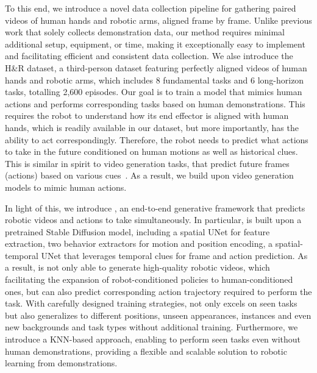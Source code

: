 To this end, we introduce a novel data collection pipeline for gathering paired videos of human hands and robotic arms, aligned frame by frame. Unlike previous work that solely collects demonstration data, our method requires minimal additional setup, equipment, or time, making it exceptionally easy to implement and facilitating efficient and consistent data collection. We alse introduce the H\&R dataset, a third-person dataset featuring perfectly aligned videos of human hands and robotic arms, which includes 8 fundamental tasks and 6 long-horizon tasks, totalling 2,600 episodes. 
Our goal is to train a model that mimics human actions and performs corresponding tasks based on human demonstrations. This requires the robot to understand how its end effector is aligned with human hands, which is readily available in our dataset, but more importantly, has the ability to act correspondingly. Therefore, the robot needs to predict what actions to take in the future conditioned on human motions as well as historical clues. This is similar in spirit to video generation tasks, that predict future frames (actions) based on various cues~\cite{dhariwal2021diffusion,hertz2022prompt,ho2022classifier,ho2022cascaded,meng2021sdedit,nichol2021improved}. As a result, we build upon video generation models to mimic human actions.


In light of this, we introduce \system , an end-to-end generative framework that predicts robotic videos and actions to take simultaneously. 
In particular, \system is built upon a pretrained Stable Diffusion model, including a spatial UNet for feature extraction, two behavior extractors for motion and position encoding, a spatial-temporal UNet that leverages temporal clues for frame and action prediction. As a result, \system is not only able to generate high-quality robotic videos, 
which facilitating the expansion of robot-conditioned policies to human-conditioned ones, but can also predict corresponding action trajectory required to perform the task.
With carefully designed training strategies, \system not only excels on seen tasks but also generalizes to different positions, unseen appearances, instances and even new backgrounds and task types without additional training. Furthermore, we introduce a KNN-based approach, enabling \system to perform seen tasks even without human demonstrations, providing a flexible and scalable solution to robotic learning from demonstrations.

